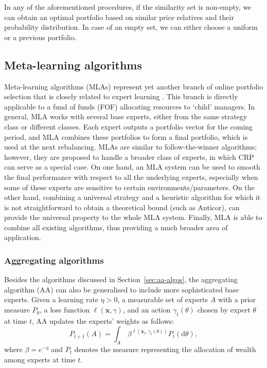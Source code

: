 In any of the aforementioned procedures, if the similarity set is non-empty, we can obtain an optimal portfolio based on similar price relatives and their probability distribution. In case of an empty set, we can either choose a uniform or a previous portfolio.




\subsection{Meta-learning algorithms}
\label{sec:mlas}

Meta-learning algorithms (MLAs) \citep{das11} represent yet another branch of online portfolio selection that is closely related to expert learning \citep{lugosi}. This branch is directly applicable to a fund of funds (FOF) allocating resources to `child' managers. In general, MLA works with several base experts, either from the same strategy class or different classes. Each expert outputs a portfolio vector for the coming period, and MLA combines these portfolios to form a final portfolio, which is used at the next rebalancing. MLAs are similar to follow-the-winner algorithms; however, they are proposed to handle a broader class of experts, in which CRP can serve as a special case. On one hand, an MLA system can be used to smooth the final performance with respect to all the underlying experts, especially when some of these experts are sensitive to certain environments/parameters. On the other hand, combining a universal strategy and a heuristic algorithm for which it is not straightforward to obtain a theoretical bound (such as Anticor), can provide the universal property to the whole MLA system. Finally, MLA is able to combine all existing algorithms, thus providing a much broader area of application.

\subsubsection{Aggregating algorithms}

Besides the algorithms discussed in Section~\ref{sec:aa-algos}, the aggregating algorithm (AA) can also be generalised to include more sophisticated base experts. Given a learning rate $\eta > 0$, a measurable set of experts $A$ with a prior measure $P_0$, a loss function $\ell(\mathbf{x}, \gamma)$, and an action $\gamma_{t}(\theta)$ chosen by expert $\theta$ at time $t$, AA updates the experts' weights as follows:
\begin{equation}
	P_{t+1}(A) = \int_{A} \, \beta^{\ell(\mathbf{x}_t, \gamma_{t}(\theta))} P_{t}(\mathrm{d}\theta),
\end{equation}
where $\beta = e^{-\eta}$ and $P_t$ denotes the measure representing the allocation of wealth among experts at time $t$.

